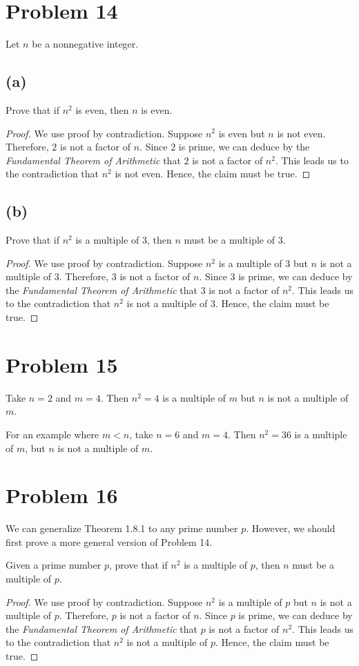 \documentclass{article}
\begin{document}
\pagebreak
\section{Problem 14}
Let $n$ be a nonnegative integer.
\subsection{(a)}
Prove that if $n^2$ is even, then $n$ is even.
\begin{proof}
	We use proof by contradiction. Suppose $n^2$ is even but $n$ is not even. Therefore, $2$ is not a factor of $n$. Since $2$ is prime, we can deduce by the \textit{Fundamental Theorem of Arithmetic} that $2$ is not a factor of $n^2$. This leads us to the contradiction that $n^2$ is not even. Hence, the claim must be true.
\end{proof}
\subsection{(b)}
Prove that if $n^2$ is a multiple of $3$, then $n$ must be a multiple of $3$.
\begin{proof}
	We use proof by contradiction. Suppose $n^2$ is a multiple of $3$ but $n$ is not a multiple of $3$. Therefore, $3$ is not a factor of $n$. Since $3$ is prime, we can deduce by the \textit{Fundamental Theorem of Arithmetic} that $3$ is not a factor of $n^2$. This leads us to the contradiction that $n^2$ is not a multiple of $3$. Hence, the claim must be true.
\end{proof}

\pagebreak

\section{Problem 15}
Take $n = 2$ and $m = 4$. Then $n^2 = 4$ is a multiple of $m$ but $n$ is not a multiple of $m$.

For an example where $m < n$, take $n = 6$ and $m = 4$. Then $n^2 = 36$ is a multiple of $m$, but $n$ is not a multiple of $m$.

\pagebreak

\section{Problem 16}
We can generalize Theorem 1.8.1 to any prime number $p$. However, we should first prove a more general version of Problem 14.

Given a prime number $p$, prove that if $n^2$ is a multiple of $p$, then $n$ must be a multiple of $p$.
\begin{proof}
	We use proof by contradiction. Suppose $n^2$ is a multiple of $p$ but $n$ is not a multiple of $p$. Therefore, $p$ is not a factor of $n$. Since $p$ is prime, we can deduce by the \textit{Fundamental Theorem of Arithmetic} that $p$ is not a factor of $n^2$. This leads us to the contradiction that $n^2$ is not a multiple of $p$. Hence, the claim must be true.
\end{proof}
\end{document}
